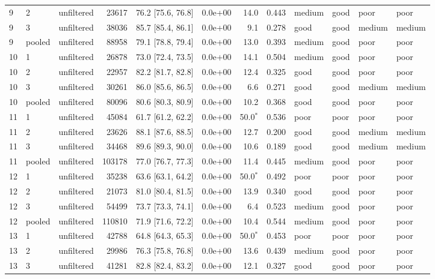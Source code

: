 \begin{longtable}{lllrrrrrllll}
9 & 2 & unfiltered & 23617 & 76.2 [75.6, 76.8] & 0.0e+00 & 14.0 & 0.443 & medium & good & poor & poor \\
9 & 3 & unfiltered & 38036 & 85.7 [85.4, 86.1] & 0.0e+00 & 9.1 & 0.278 & good & good & medium & medium \\
9 & pooled & unfiltered & 88958 & 79.1 [78.8, 79.4] & 0.0e+00 & 13.0 & 0.393 & medium & good & poor & poor \\
10 & 1 & unfiltered & 26878 & 73.0 [72.4, 73.5] & 0.0e+00 & 14.1 & 0.504 & medium & good & poor & poor \\
10 & 2 & unfiltered & 22957 & 82.2 [81.7, 82.8] & 0.0e+00 & 12.4 & 0.325 & good & good & poor & poor \\
10 & 3 & unfiltered & 30261 & 86.0 [85.6, 86.5] & 0.0e+00 & 6.6 & 0.271 & good & good & medium & medium \\
10 & pooled & unfiltered & 80096 & 80.6 [80.3, 80.9] & 0.0e+00 & 10.2 & 0.368 & good & good & poor & poor \\
11 & 1 & unfiltered & 45084 & 61.7 [61.2, 62.2] & 0.0e+00 & 50.0$^\ast$ & 0.536 & poor & poor & poor & poor \\
11 & 2 & unfiltered & 23626 & 88.1 [87.6, 88.5] & 0.0e+00 & 12.7 & 0.200 & good & good & medium & medium \\
11 & 3 & unfiltered & 34468 & 89.6 [89.3, 90.0] & 0.0e+00 & 10.6 & 0.189 & good & good & medium & medium \\
11 & pooled & unfiltered & 103178 & 77.0 [76.7, 77.3] & 0.0e+00 & 11.4 & 0.445 & medium & good & poor & poor \\
12 & 1 & unfiltered & 35238 & 63.6 [63.1, 64.2] & 0.0e+00 & 50.0$^\ast$ & 0.492 & poor & poor & poor & poor \\
12 & 2 & unfiltered & 21073 & 81.0 [80.4, 81.5] & 0.0e+00 & 13.9 & 0.340 & good & good & poor & poor \\
12 & 3 & unfiltered & 54499 & 73.7 [73.3, 74.1] & 0.0e+00 & 6.4 & 0.523 & medium & good & poor & poor \\
12 & pooled & unfiltered & 110810 & 71.9 [71.6, 72.2] & 0.0e+00 & 10.4 & 0.544 & medium & good & poor & poor \\
13 & 1 & unfiltered & 42788 & 64.8 [64.3, 65.3] & 0.0e+00 & 50.0$^\ast$ & 0.453 & poor & poor & poor & poor \\
13 & 2 & unfiltered & 29986 & 76.3 [75.8, 76.8] & 0.0e+00 & 13.6 & 0.439 & medium & good & poor & poor \\
13 & 3 & unfiltered & 41281 & 82.8 [82.4, 83.2] & 0.0e+00 & 12.1 & 0.327 & good & good & poor & poor \\

\end{longtable}
